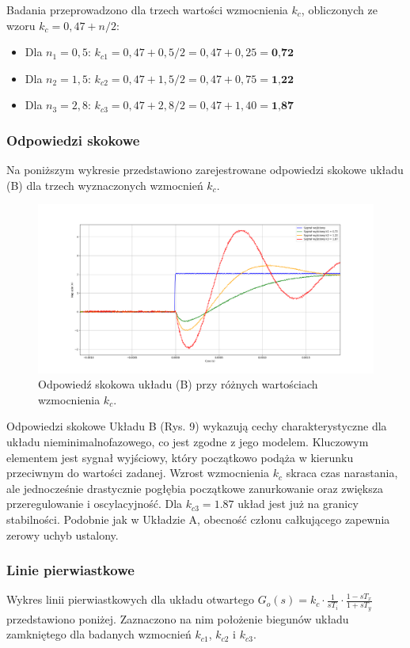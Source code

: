 \documentclass[12pt,a4paper]{article}
\begin{document}
	Badania przeprowadzono dla trzech wartości wzmocnienia \(k_c\), obliczonych ze wzoru \(k_c = 0,47 + n/2\):
	\begin{itemize}
		\item Dla \(n_1 = 0,5\): $k_{c1} = 0,47 + 0,5 / 2 = 0,47 + 0,25 = \textbf{0,72}$
		\item Dla \(n_2 = 1,5\): $k_{c2} = 0,47 + 1,5 / 2 = 0,47 + 0,75 = \textbf{1,22}$
		\item Dla \(n_3 = 2,8\): $k_{c3} = 0,47 + 2,8 / 2 = 0,47 + 1,40 = \textbf{1,87}$
	\end{itemize}
	
	\subsubsection{Odpowiedzi skokowe}
	Na poniższym wykresie przedstawiono zarejestrowane odpowiedzi skokowe układu (B) dla trzech wyznaczonych wzmocnień \(k_c\).
	
	\begin{figure}[H]
	\centering
	\includegraphics[width=1\linewidth]{zdjecia/OdpSkokB.png}
	\caption{Odpowiedź skokowa układu (B) przy różnych wartościach wzmocnienia \(k_c\).}
	\label{fig:OdpSkokB}
	\end{figure}
	
	Odpowiedzi skokowe Układu B (Rys. 9) wykazują cechy charakterystyczne dla układu nieminimalnofazowego, co jest zgodne z jego modelem. Kluczowym elementem jest sygnał wyjściowy, który początkowo podąża w kierunku przeciwnym do wartości zadanej. Wzrost wzmocnienia $k_c$ skraca czas narastania, ale jednocześnie drastycznie pogłębia początkowe zanurkowanie oraz zwiększa przeregulowanie i oscylacyjność. Dla $k_{c3}=1.87$ układ jest już na granicy stabilności. Podobnie jak w Układzie A, obecność członu całkującego zapewnia zerowy uchyb ustalony.
	
	\subsubsection{Linie pierwiastkowe}
	Wykres linii pierwiastkowych dla układu otwartego \(G_o(s) = k_c \cdot \frac{1}{sT_i} \cdot
	\frac{1-sT_x}{1+sT_y}\) przedstawiono poniżej. Zaznaczono na nim położenie biegunów układu zamkniętego dla badanych wzmocnień \(k_{c1}\), \(k_{c2}\) i \(k_{c3}\).
	
\end{document}
